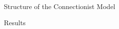 \documentclass[final]{beamer}
\newlength{\twocolwid}
\begin{document}
\begin{frame}[t]
\begin{columns}[t]
\begin{column}{\twocolwid}
\begin{block}{Structure of the Connectionist Model}
%
%
%
%
%
%
%
%

\end{block}


\begin{block}{Results}

\begin{columns}[t]
%      
      
            \begin{column}{.33\linewidth}
            

\end{column}
\end{columns}
\end{block}
\end{column}
\end{columns}
\end{frame}
\end{document}
